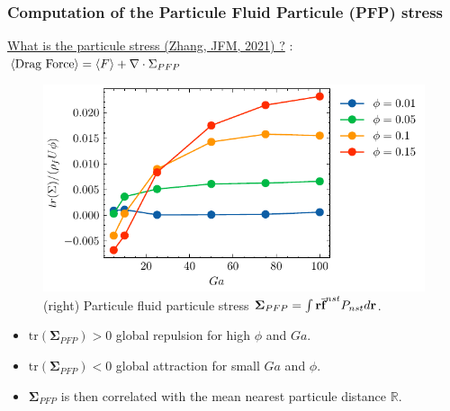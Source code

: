 \documentclass{sintefbeamer}
\begin{document}
\begin{frame}
  \frametitle{Computation of the Particule Fluid Particule (PFP) stress}
  \underline{What is the particule stress (Zhang, JFM, 2021) ?}  
   : $\left<\text{Drag Force}\right> = \left<F\right> + \mathbf{\nabla}\cdot \Sigma_{PFP}$
  \begin{figure}
    \includegraphics[height=0.23\textwidth]{image/HOMOGENEOUS/fPA/PFP.pdf}
    \caption{ 
      (right) Particule fluid particule stress $\mathbf{\Sigma}_{PFP} = \int \textbf{r}\overline{\textbf{f}}^{nst} P_{nst}d\textbf{r}$.
      }
  \end{figure}
  
\begin{itemize}
  \item $\text{tr}(\mathbf{\Sigma}_{PFP}) > 0$ global repulsion for high $\phi$ and $Ga$. 
  \item $\text{tr}(\mathbf{\Sigma}_{PFP}) < 0$ global attraction for small $Ga$ and $\phi$.
  \item  $\mathbf{\Sigma}_{PFP}$ is then correlated with the mean nearest particule distance $\mathbb{R}$. 
\end{itemize}

\end{frame}
\end{document}
